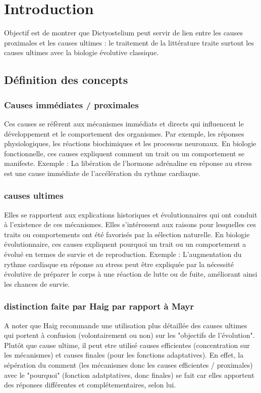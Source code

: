 \documentclass[twocolumn,10pt]{article} %
\begin{document}
\section{Introduction}
Objectif est de montrer que Dictyostelium peut servir de lien entre les causes proximales et les causes ultimes :
le traitement de la littérature traite surtout les causes ultimes avec la biologie évolutive classique.
   
   
    \subsection{Définition des concepts}
    \cite{Haig_2003}
    \cite{Mayr_1961}
    
            \subsubsection{Causes immédiates / proximales}
               Ces causes se réfèrent aux mécanismes immédiats et directs qui influencent le développement et le comportement des organismes. Par exemple, les réponses physiologiques, les réactions biochimiques et les processus neuronaux.
               En biologie fonctionnelle, ces causes expliquent comment un trait ou un comportement se manifeste.
               Exemple : La libération de l'hormone adrénaline en réponse au stress est une cause immédiate de l'accélération du rythme cardiaque.
   
               \subsubsection{causes ultimes}
               Elles se rapportent aux explications historiques et évolutionnaires qui ont conduit à l'existence de ces mécanismes. Elles s'intéressent aux raisons pour lesquelles ces traits ou comportements ont été favorisés par la sélection naturelle.
               En biologie évolutionnaire, ces causes expliquent pourquoi un trait ou un comportement a évolué en termes de survie et de reproduction.
               Exemple : L'augmentation du rythme cardiaque en réponse au stress peut être expliquée par la nécessité évolutive de préparer le corps à une réaction de lutte ou de fuite, améliorant ainsi les chances de survie.
   
               
               \subsubsection{distinction faite par Haig par rapport à Mayr}
               A noter que Haig recommande une utilisation plus détaillée des causes ultimes qui portent à confusion (volontairement ou non) sur les "objectifs de l'évolution". 
               Plutôt que cause ultime, il peut etre utilisé causes efficientes (concentration sur les mécanismes) et causes finales (pour les fonctions adaptatives).
               En effet, la sépération du comment (les mécanismes donc les causes efficientes / proximales) avec le "pourquoi" (fonction adatptatives, donc finales) 
               se fait car elles apportent des réponses différentes et complétementaires, selon lui. 
   
\end{document}

